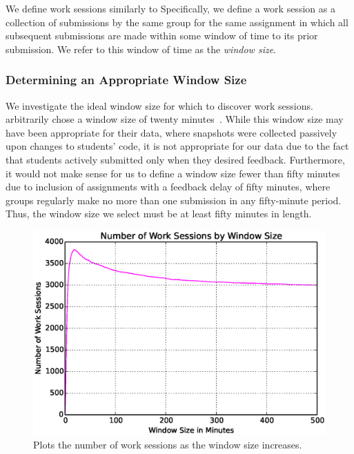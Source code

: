 We define work sessions similarly to \spacco[.]{} Specifically, we define a
work session as a collection of submissions by the same group for the same
assignment in which all subsequent submissions are made within some window of
time to its prior submission. We refer to this window of time as the
\emph{window size}.

\subsubsection{Determining an Appropriate Window Size}

We investigate the ideal window size for which to discover work
sessions. \spacco{} arbitrarily chose a window size of twenty
minutes~\cite{Spacco:2013:TIP:2462476.2465594}. While this window size may have
been appropriate for their data, where snapshots were collected passively upon
changes to students' code, it is not appropriate for our data due to the fact
that students actively submitted only when they desired feedback. Furthermore,
it would not make sense for us to define a window size fewer than fifty minutes
due to inclusion of assignments with a feedback delay of fifty minutes, where
groups regularly make no more than one submission in any fifty-minute
period. Thus, the window size we select must be at least fifty minutes in
length.

\begin{figure}[!t]
\centering
\includegraphics[width=5.25in]{graphs/Number_of_Work_Sessions_by_Window_Size.eps}
\caption{Plots the number of work sessions as the window size increases.}
\end{figure}


